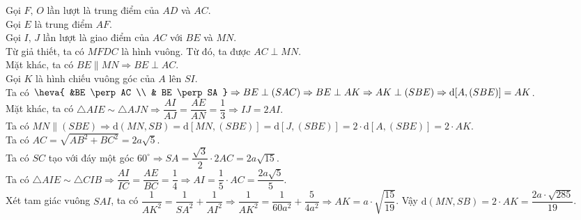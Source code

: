 \begin{ex}
{\begin{center}
	\end{center}	
	Gọi $ F,\, O $ lần lượt là trung điểm của  $ AD $ và $ AC $.\\
	Gọi $ E $ là trung điểm $ AF $.\\
	Gọi $ I,\, J $ lần lượt là giao điểm của $ AC $ với $ BE $ và $ MN $.
	\\
	Từ giả thiết, ta có $ MFDC $ là hình vuông. Từ đó, ta được $ AC \perp MN $.\\
	Mặt khác, ta có $ BE \parallel MN \Rightarrow BE \perp AC $.
	\\
	Gọi $ K  $ là hình chiếu vuông góc của $ A $ lên $ SI $.\\
	Ta có $ \heva{ &BE \perp AC \\ & BE \perp SA } \Rightarrow BE \perp (SAC) \Rightarrow BE \perp AK \Rightarrow AK \perp (SBE) \Rightarrow \mathrm{d}[A,(SBE)] = AK $.\\
	Mặt khác, ta có $ \triangle AIE \sim \triangle AJN \Rightarrow \dfrac{AI}{AJ} = \dfrac{AE}{AN} = \dfrac{1}{3} \Rightarrow IJ = 2 AI. $\\
	Ta có $ MN \parallel (SBE) \Rightarrow \mathrm{d}(MN,SB) = \mathrm{d}[MN,(SBE)] = \mathrm{d}[J,(SBE)] = 2\cdot \mathrm{d}[A,(SBE)] = 2\cdot AK $.\\
	Ta có $ AC = \sqrt{AB^2 + BC^2} = 2a\sqrt{5} $.\\
	Ta có $ SC $ tạo với đáy một góc $ 60^{\circ} \Rightarrow SA = \dfrac{\sqrt{3}}{2}\cdot 2 AC = 2a\sqrt{15} $.\\
	Ta có $ \triangle AIE \sim \triangle CIB \Rightarrow \dfrac{AI}{IC}= \dfrac{AE}{BC} = \dfrac{1}{4} \Rightarrow AI = \dfrac{1}{5}\cdot AC = \dfrac{2a \sqrt{5}}{5} $.\\
	Xét tam giác vuông $ SAI $, ta có $ \dfrac{1}{AK^2} = \dfrac{1}{SA^2}+\dfrac{1}{AI^2} \Rightarrow \dfrac{1}{AK^2} = \dfrac{1}{60a^2} + \dfrac{5}{4a^2} \Rightarrow AK = a \cdot \sqrt{\dfrac{15}{19}} $.
	Vậy $ \mathrm{d}(MN,SB) = 2\cdot AK = \dfrac{2a \cdot \sqrt{285} }{19} $.
	
}	
\end{ex}
